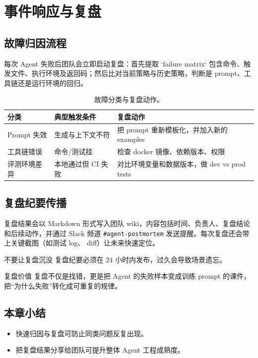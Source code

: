\documentclass[a4paper]{article}
\begin{document}
\section{事件响应与复盘}
\subsection{故障归因流程}
每次 Agent 失败后团队会立即启动复盘：首先提取 `failure matrix` 包含命令、触发文件、执行环境及返回码；然后比对当前策略与历史策略，判断是 prompt、工具链还是运行环境的回归。

\begin{table}[H]
\centering
\begin{tabular}{p{} p{} p{}}
\toprule
分类 & 典型触发条件 & 复盘动作 \\
\midrule
Prompt 失效 & 生成与上下文不符 & 把 prompt 重新模板化，并加入新的 examples \\
\midrule
工具链错误 & 命令/测试挂 & 检查 docker 镜像、依赖版本、权限 \\
\midrule
评测环境差异 & 本地通过但 CI 失败 & 对比环境变量和数据版本，做 dev vs prod tests \\
\bottomrule
\end{tabular}
\caption{故障分类与复盘动作。}
\end{table}

\subsection{复盘纪要传播}
复盘结果会以 Markdown 形式写入团队 wiki，内容包括时间、负责人、复盘结论和后续动作，并通过 Slack 频道 \texttt{\#agent-postmortem} 发送提醒。每次复盘还会带上关键截图（如测试 log、 diff）让未来快速定位。

\begin{warningbox}{不要让复盘沉没}
复盘纪要必须在 24 小时内发布，过久会导致场景遗忘。
\end{warningbox}

\begin{knowledgebox}{复盘价值}
复盘不仅是找错，更是把 Agent 的失败样本变成训练 prompt 的课件，把“为什么失败”转化成可重复的规律。
\end{knowledgebox}

\subsection{本章小结}
\begin{itemize}
    \item 快速归因与复盘可防止同类问题反复出现。
    \item 把复盘结果分享给团队可提升整体 Agent 工程成熟度。
\end{itemize}
\end{document}
